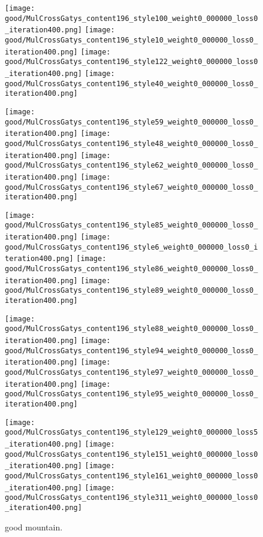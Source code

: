\documentclass[runningheads]{llncs}
\begin{document}
\begin{figure*}[!htbp]
\centering
\small 

	\texttt{[image: good/MulCrossGatys\_content196\_style100\_weight0\_000000\_loss0\_iteration400.png]}
    \texttt{[image: good/MulCrossGatys\_content196\_style10\_weight0\_000000\_loss0\_iteration400.png]}
    \texttt{[image: good/MulCrossGatys\_content196\_style122\_weight0\_000000\_loss0\_iteration400.png]}
    \texttt{[image: good/MulCrossGatys\_content196\_style40\_weight0\_000000\_loss0\_iteration400.png]}
    
    \texttt{[image: good/MulCrossGatys\_content196\_style59\_weight0\_000000\_loss0\_iteration400.png]}
    \texttt{[image: good/MulCrossGatys\_content196\_style48\_weight0\_000000\_loss0\_iteration400.png]}
    \texttt{[image: good/MulCrossGatys\_content196\_style62\_weight0\_000000\_loss0\_iteration400.png]}
    \texttt{[image: good/MulCrossGatys\_content196\_style67\_weight0\_000000\_loss0\_iteration400.png]}
    
    \texttt{[image: good/MulCrossGatys\_content196\_style85\_weight0\_000000\_loss0\_iteration400.png]}
    \texttt{[image: good/MulCrossGatys\_content196\_style6\_weight0\_000000\_loss0\_iteration400.png]}
    \texttt{[image: good/MulCrossGatys\_content196\_style86\_weight0\_000000\_loss0\_iteration400.png]}
    \texttt{[image: good/MulCrossGatys\_content196\_style89\_weight0\_000000\_loss0\_iteration400.png]}
    
        \texttt{[image: good/MulCrossGatys\_content196\_style88\_weight0\_000000\_loss0\_iteration400.png]}
    \texttt{[image: good/MulCrossGatys\_content196\_style94\_weight0\_000000\_loss0\_iteration400.png]}
    \texttt{[image: good/MulCrossGatys\_content196\_style97\_weight0\_000000\_loss0\_iteration400.png]}
    \texttt{[image: good/MulCrossGatys\_content196\_style95\_weight0\_000000\_loss0\_iteration400.png]}
    
    \texttt{[image: good/MulCrossGatys\_content196\_style129\_weight0\_000000\_loss5\_iteration400.png]}
    \texttt{[image: good/MulCrossGatys\_content196\_style151\_weight0\_000000\_loss0\_iteration400.png]}
    \texttt{[image: good/MulCrossGatys\_content196\_style161\_weight0\_000000\_loss0\_iteration400.png]}
    \texttt{[image: good/MulCrossGatys\_content196\_style311\_weight0\_000000\_loss0\_iteration400.png]}
\caption{good mountain.  }
\label{fig:good1}
\end{figure*}
\end{document}
